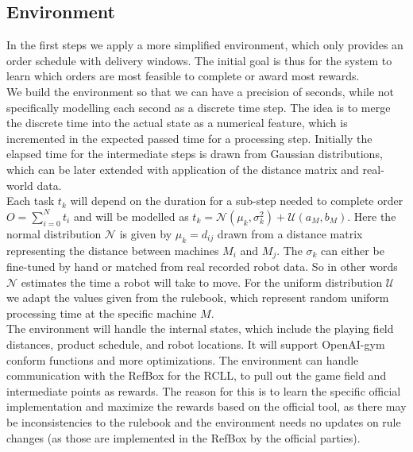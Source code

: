 \documentclass[runningheads,envcountsect]{llncs}
\begin{document}
\subsection{Environment} \label{env}
In the first steps we apply a more simplified environment, which only provides an order schedule with delivery windows. The initial goal is thus for the system to learn which orders are most feasible to complete or award most rewards.\\
We build the environment so that we can have a precision of seconds, while not specifically modelling each second as a discrete time step. The idea is to merge the discrete time into the actual state as a numerical feature, which is incremented in the expected passed time for a processing step. Initially the elapsed time for the intermediate steps is drawn from Gaussian distributions, which can be later extended with application of the distance matrix and real-world data.\\
Each task $t_k$ will depend on the duration for a sub-step needed to complete order $O=\sum_{i=0}^N t_i$ and will be modelled as $t_k = \mathcal{N}(\mu_k, \sigma_k^2) + \mathcal{U}(a_M,b_M)$. Here the normal distribution $\mathcal{N}$ is given by $\mu_k=d_{ij}$ drawn from a distance matrix representing the distance between machines $M_i$ and $M_j$. The $\sigma_k$ can either be fine-tuned by hand or matched from real recorded robot data. So in other words $\mathcal{N}$ estimates the time a robot will take to move. For the uniform distribution $\mathcal{U}$ we adapt the values given from the rulebook, which represent random uniform processing time at the specific machine $M$.\\
The environment will handle the internal states, which include the playing field distances, product schedule, and robot locations. It will support OpenAI-gym conform functions and more optimizations. The environment can handle communication with the RefBox for the RCLL, to pull out the game field and intermediate points as rewards. The reason for this is to learn the specific official implementation and maximize the rewards based on the official tool, as there may be inconsistencies to the rulebook and the environment needs no updates on rule changes (as those are implemented in the RefBox by the official parties).
\end{document}
